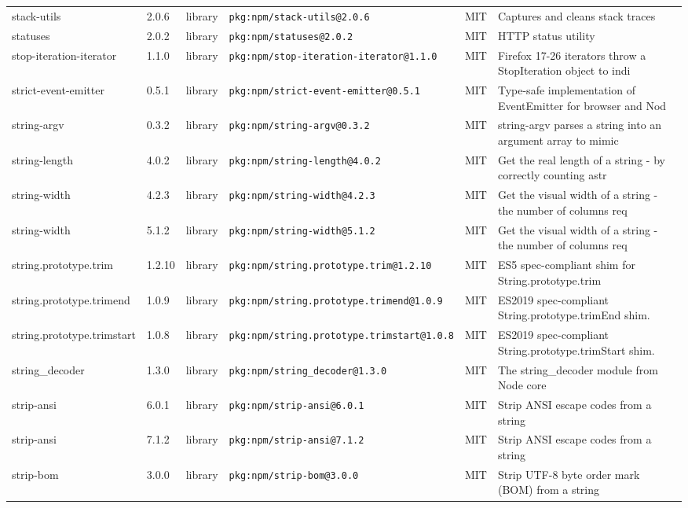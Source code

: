 \documentclass[11pt]{article}
\begin{document}
\begin{longtable}{|l|l|l|p{2.2cm}|l|p{4cm}|}
stack-utils & 2.0.6 & library & \texttt{pkg:npm/stack-utils@2.0.6} & MIT & Captures and cleans stack traces \\
statuses & 2.0.2 & library & \texttt{pkg:npm/statuses@2.0.2} & MIT & HTTP status utility \\
stop-iteration-iterator & 1.1.0 & library & \texttt{pkg:npm/stop-iteration-iterator@1.1.0} & MIT & Firefox 17-26 iterators throw a StopIteration object to indi \\
strict-event-emitter & 0.5.1 & library & \texttt{pkg:npm/strict-event-emitter@0.5.1} & MIT & Type-safe implementation of EventEmitter for browser and Nod \\
string-argv & 0.3.2 & library & \texttt{pkg:npm/string-argv@0.3.2} & MIT & string-argv parses a string into an argument array to mimic  \\
string-length & 4.0.2 & library & \texttt{pkg:npm/string-length@4.0.2} & MIT & Get the real length of a string - by correctly counting astr \\
string-width & 4.2.3 & library & \texttt{pkg:npm/string-width@4.2.3} & MIT & Get the visual width of a string - the number of columns req \\
string-width & 5.1.2 & library & \texttt{pkg:npm/string-width@5.1.2} & MIT & Get the visual width of a string - the number of columns req \\
string.prototype.trim & 1.2.10 & library & \texttt{pkg:npm/string.prototype.trim@1.2.10} & MIT & ES5 spec-compliant shim for String.prototype.trim \\
string.prototype.trimend & 1.0.9 & library & \texttt{pkg:npm/string.prototype.trimend@1.0.9} & MIT & ES2019 spec-compliant String.prototype.trimEnd shim. \\
string.prototype.trimstart & 1.0.8 & library & \texttt{pkg:npm/string.prototype.trimstart@1.0.8} & MIT & ES2019 spec-compliant String.prototype.trimStart shim. \\
string\_decoder & 1.3.0 & library & \texttt{pkg:npm/string\_decoder@1.3.0} & MIT & The string\_decoder module from Node core \\
strip-ansi & 6.0.1 & library & \texttt{pkg:npm/strip-ansi@6.0.1} & MIT & Strip ANSI escape codes from a string \\
strip-ansi & 7.1.2 & library & \texttt{pkg:npm/strip-ansi@7.1.2} & MIT & Strip ANSI escape codes from a string \\
strip-bom & 3.0.0 & library & \texttt{pkg:npm/strip-bom@3.0.0} & MIT & Strip UTF-8 byte order mark (BOM) from a string \\

\end{longtable}
\end{document}
